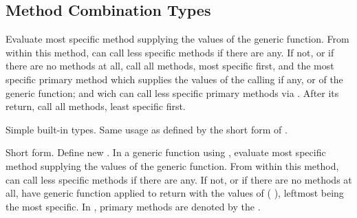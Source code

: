 \subsection[Method Combi- nation Types]{Method Combination Types} 
\label{section:Method Combination Types}
\begin{LIST}{1cm}

  {
  Evaluate most specific  method supplying the values of
  the generic function. From within this method, 
  can call less specific  methods if there are any. If
  not, or if there are no  methods at all, call all
   methods, most specific first, and the most specific
  primary method which supplies the values of the calling
   if any, or of the generic function; and wich
  can call less specific primary methods via
  . After its return, call all 
  methods, least specific first.
  }

  {
    Simple built-in  types. Same usage as
     defined by the short form of
    . 
  }

  {
  Short form. Define new 
  . In a generic function using ,
  evaluate most specific  method supplying the values of
  the generic function. From within this method, 
  can call less specific  methods if there are any. If
  not, or if there are no  methods at all, %
  have generic function applied to  return with the
  values of ( ), leftmost  being the most
  specific. In , primary methods are denoted by the
   . 
    }


\end{LIST}
